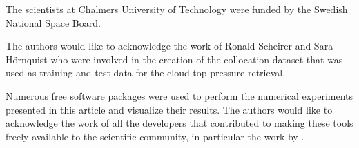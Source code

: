 \documentclass[journal abbreviation, manuscript]{copernicus}
\begin{document}






\begin{acknowledgements}
The scientists at Chalmers University of Technology were funded by the Swedish National Space Board.

The authors would like to acknowledge the work of Ronald Scheirer and Sara
Hörnquist who were involved in the creation of the collocation dataset that was
used as training and test data for the cloud top pressure retrieval.

Numerous free software packages were used to perform the numerical experiments
presented in this article and visualize their results. The authors would like to
acknowledge the work of all the developers that contributed to making these tools
freely available to the scientific community, in particular the work by
\citet{matplotlib, ipython, numpy, python}.
\end{acknowledgements}











\end{document}
